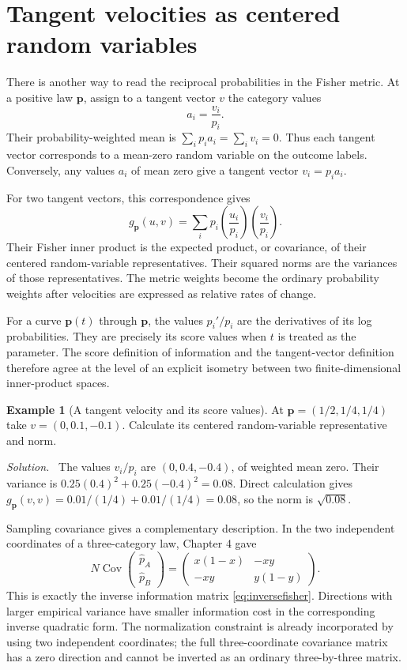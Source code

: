 \documentclass[11pt,oneside,openany]{book}
\theoremstyle{definition}
\newtheorem{example}{Example}[chapter]
\theoremstyle{remark}
\newenvironment{solution}{\par\smallskip\noindent\textit{Solution.}\ }{\par\smallskip}
\newcommand{\p}{\mathbf{p}}
\numberwithin{equation}{chapter}
\begin{document}
\section{Tangent velocities as centered random variables}
There is another way to read the reciprocal probabilities in the Fisher metric. At a positive law $\p$, assign to a tangent vector $v$ the category values
\[
a_i=\frac{v_i}{p_i}.
\]
Their probability-weighted mean is $\sum_i p_i a_i=\sum_i v_i=0$. Thus each tangent vector corresponds to a mean-zero random variable on the outcome labels. Conversely, any values $a_i$ of mean zero give a tangent vector $v_i=p_i a_i$.

For two tangent vectors, this correspondence gives
\[
g_\p(u,v)=\sum_i p_i\left(\frac{u_i}{p_i}\right)
\left(\frac{v_i}{p_i}\right).
\]
Their Fisher inner product is the expected product, or covariance, of their centered random-variable representatives. Their squared norms are the variances of those representatives. The metric weights become the ordinary probability weights after velocities are expressed as relative rates of change.

For a curve $\p(t)$ through $\p$, the values $p_i'/p_i$ are the derivatives of its log probabilities. They are precisely its score values when $t$ is treated as the parameter. The score definition of information and the tangent-vector definition therefore agree at the level of an explicit isometry between two finite-dimensional inner-product spaces.

\begin{example}[A tangent velocity and its score values]
At $\p=(1/2,1/4,1/4)$ take $v=(0,0.1,-0.1)$. Calculate its centered random-variable representative and norm.
\begin{solution}
The values $v_i/p_i$ are $(0,0.4,-0.4)$, of weighted mean zero. Their variance is $0.25(0.4)^2+0.25(-0.4)^2=0.08$. Direct calculation gives $g_\p(v,v)=0.01/(1/4)+0.01/(1/4)=0.08$, so the norm is $\sqrt{0.08}$.
\end{solution}
\end{example}

Sampling covariance gives a complementary description. In the two independent coordinates of a three-category law, Chapter 4 gave
\[
N\operatorname{Cov}\begin{pmatrix}\widehat p_A\\\widehat p_B\end{pmatrix}
=\begin{pmatrix}x(1-x)&-xy\\-xy&y(1-y)\end{pmatrix}.
\]
This is exactly the inverse information matrix \eqref{eq:inversefisher}. Directions with larger empirical variance have smaller information cost in the corresponding inverse quadratic form. The normalization constraint is already incorporated by using two independent coordinates; the full three-coordinate covariance matrix has a zero direction and cannot be inverted as an ordinary three-by-three matrix.
\end{document}
